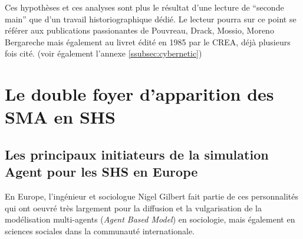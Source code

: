 Ces hypothèses et ces analyses sont plus le résultat d'une lecture de \enquote{seconde main} que d'un travail historiographique dédié. Le lecteur pourra sur ce point se référer aux publications passionantes de Pouvreau, Drack, Mossio, Moreno Bergareche \autocites{Pouvreau2006, Pouvreau2013, Drack2015, Mossio2010, Mossio2014, Bergareche2015} mais également au livret édité en 1985 par le CREA, déjà plusieurs fois cité. (voir également l'annexe \ref{ssubsec:cybernetic})


\printbibliography[heading=subbibliography]



\chapter{Le double foyer d'apparition des SMA en SHS}
\label{chap:double_foyer_sma}

\section{Les principaux initiateurs de la simulation Agent pour les SHS en Europe}
\label{s:communautes_europe}



En Europe, l'ingénieur et sociologue Nigel Gilbert fait partie de ces personnalités qui ont oeuvré très largement pour la diffusion et la vulgarisation de la modélisation multi-agents (\textit{Agent Based Model}) en sociologie, mais également en sciences sociales dans la communauté internationale.

